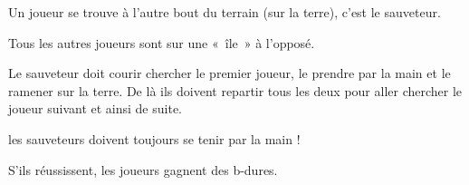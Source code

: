 \documentclass{grand-jeu}
\begin{document}
\begin{regles}
Un joueur se trouve à l’autre bout du terrain (sur la terre), c’est le sauveteur.

Tous les autres joueurs sont sur une « île » à l’opposé. 

Le sauveteur doit courir chercher le premier joueur, le prendre par la main et le ramener sur la terre. De là ils doivent repartir tous les deux pour aller chercher le joueur suivant et ainsi de suite. 

les sauveteurs doivent toujours se tenir par la main !

S'ils réussissent, les joueurs gagnent des b-dures. 
\end{regles}

\begin{imaginaire}

\end{imaginaire}

\begin{moments-stop}
\end{moments-stop}
\end{document}
